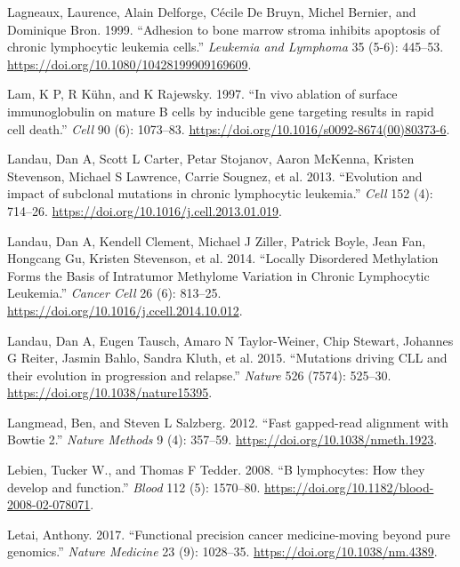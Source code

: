 \documentclass[11pt, a4paper, twosided]{book}
\newenvironment{CSLReferences}%
  {}%
  {\par}
\begin{document}
\begin{CSLReferences}{1}{0}
\leavevmode{}%
Lagneaux, Laurence, Alain Delforge, Cécile De Bruyn, Michel Bernier, and Dominique Bron. 1999. {``{Adhesion to bone marrow stroma inhibits apoptosis of chronic lymphocytic leukemia cells}.''} \emph{Leukemia and Lymphoma} 35 (5-6): 445--53. \url{https://doi.org/10.1080/10428199909169609}.

\leavevmode{}%
Lam, K P, R Kühn, and K Rajewsky. 1997. {``{In vivo ablation of surface immunoglobulin on mature B cells by inducible gene targeting results in rapid cell death.}''} \emph{Cell} 90 (6): 1073--83. \url{https://doi.org/10.1016/s0092-8674(00)80373-6}.

\leavevmode{}%
Landau, Dan A, Scott L Carter, Petar Stojanov, Aaron McKenna, Kristen Stevenson, Michael S Lawrence, Carrie Sougnez, et al. 2013. {``{Evolution and impact of subclonal mutations in chronic lymphocytic leukemia.}''} \emph{Cell} 152 (4): 714--26. \url{https://doi.org/10.1016/j.cell.2013.01.019}.

\leavevmode{}%
Landau, Dan A, Kendell Clement, Michael J Ziller, Patrick Boyle, Jean Fan, Hongcang Gu, Kristen Stevenson, et al. 2014. {``{Locally Disordered Methylation Forms the Basis of Intratumor Methylome Variation in Chronic Lymphocytic Leukemia}.''} \emph{Cancer Cell} 26 (6): 813--25. \url{https://doi.org/10.1016/j.ccell.2014.10.012}.

\leavevmode{}%
Landau, Dan A, Eugen Tausch, Amaro N Taylor-Weiner, Chip Stewart, Johannes G Reiter, Jasmin Bahlo, Sandra Kluth, et al. 2015. {``{Mutations driving CLL and their evolution in progression and relapse}.''} \emph{Nature} 526 (7574): 525--30. \url{https://doi.org/10.1038/nature15395}.

\leavevmode{}%
Langmead, Ben, and Steven L Salzberg. 2012. {``{Fast gapped-read alignment with Bowtie 2}.''} \emph{Nature Methods} 9 (4): 357--59. \url{https://doi.org/10.1038/nmeth.1923}.

\leavevmode{}%
Lebien, Tucker W., and Thomas F Tedder. 2008. {``{B lymphocytes: How they develop and function}.''} \emph{Blood} 112 (5): 1570--80. \url{https://doi.org/10.1182/blood-2008-02-078071}.

\leavevmode{}%
Letai, Anthony. 2017. {``{Functional precision cancer medicine-moving beyond pure genomics.}''} \emph{Nature Medicine} 23 (9): 1028--35. \url{https://doi.org/10.1038/nm.4389}.


\end{CSLReferences}
\end{document}
